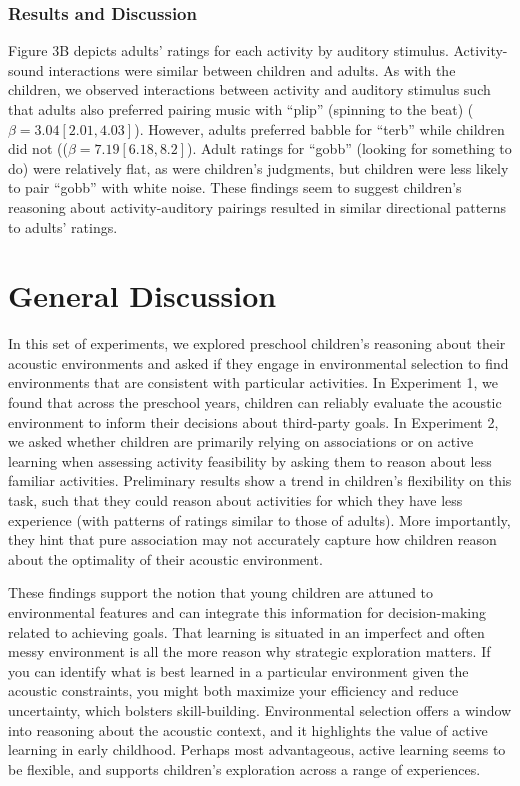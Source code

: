 \documentclass[10pt, letterpaper]{article}
\begin{document}
\hypertarget{results-and-discussion-2}{%
\subsubsection{Results and Discussion}\label{results-and-discussion-2}}

Figure 3B depicts adults' ratings for each activity by auditory
stimulus. Activity-sound interactions were similar between children and
adults. As with the children, we observed interactions between activity
and auditory stimulus such that adults also preferred pairing music with
``plip'' (spinning to the beat) (\(\beta = 3.04 [2.01, 4.03]\)).
However, adults preferred babble for ``terb'' while children did not
((\(\beta = 7.19 [6.18, 8.2]\)). Adult ratings for ``gobb'' (looking for
something to do) were relatively flat, as were children's judgments, but
children were less likely to pair ``gobb'' with white noise. These
findings seem to suggest children's reasoning about activity-auditory
pairings resulted in similar directional patterns to adults' ratings.

\hypertarget{general-discussion}{%
\section{General Discussion}\label{general-discussion}}

In this set of experiments, we explored preschool children's reasoning
about their acoustic environments and asked if they engage in
environmental selection to find environments that are consistent with
particular activities. In Experiment 1, we found that across the
preschool years, children can reliably evaluate the acoustic environment
to inform their decisions about third-party goals. In Experiment 2, we
asked whether children are primarily relying on associations or on
active learning when assessing activity feasibility by asking them to
reason about less familiar activities. Preliminary results show a trend
in children's flexibility on this task, such that they could reason
about activities for which they have less experience (with patterns of
ratings similar to those of adults). More importantly, they hint that
pure association may not accurately capture how children reason about
the optimality of their acoustic environment.

These findings support the notion that young children are attuned to
environmental features and can integrate this information for
decision-making related to achieving goals. That learning is situated in
an imperfect and often messy environment is all the more reason why
strategic exploration matters. If you can identify what is best learned
in a particular environment given the acoustic constraints, you might
both maximize your efficiency and reduce uncertainty, which bolsters
skill-building. Environmental selection offers a window into reasoning
about the acoustic context, and it highlights the value of active
learning in early childhood. Perhaps most advantageous, active learning
seems to be flexible, and supports children's exploration across a range
of experiences.
\end{document}
